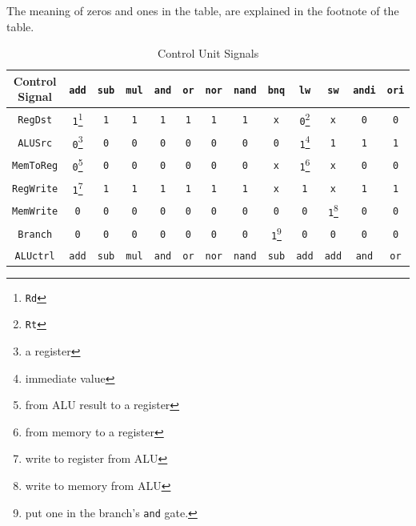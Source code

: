 \documentclass[12pt, dvipsnames, svgnames, x11names, oneside]{book}
\begin{document}
The meaning of zeros and ones in the table, are explained in the footnote of the table.

\begin{table}
\caption{Control Unit Signals}
\begin{center}
\begin{tabular}{|c|c|c|c|c|c|c|c|c|c|c|c|c|}
\hline
Control Signal &
\texttt{add} &
\texttt{sub} &
\texttt{mul} &
\texttt{and} &
\texttt{or} &
\texttt{nor} &
\texttt{nand} &
\texttt{bnq} &
\texttt{lw} &
\texttt{sw} &
\texttt{andi} &
\texttt{ori} \\
\hline
\hline
\texttt{RegDst} & 
\texttt{1}\footnote{\texttt{Rd}} &
\texttt{1} &
\texttt{1} &
\texttt{1} &
\texttt{1} &
\texttt{1} &
\texttt{1} &
\texttt{x} &
\texttt{0}\footnote{\texttt{Rt}} &
\texttt{x} &
\texttt{0} &
\texttt{0} \\
\hline
\texttt{ALUSrc} &
\texttt{0}\footnote{a register} &
\texttt{0} &
\texttt{0} &
\texttt{0} &
\texttt{0} &
\texttt{0} &
\texttt{0} &
\texttt{0} &
\texttt{1}\footnote{immediate value} &
\texttt{1} &
\texttt{1} &
\texttt{1} \\ 
\hline
\texttt{MemToReg} &
\texttt{0}\footnote{from ALU result to a register} &
\texttt{0} &
\texttt{0} &
\texttt{0} &
\texttt{0} &
\texttt{0} &
\texttt{0} &
\texttt{x} &
\texttt{1}\footnote{from memory to a register} &
\texttt{x} &
\texttt{0} &
\texttt{0} \\ 
\hline
\texttt{RegWrite} &
\texttt{1}\footnote{write to register from ALU} &
\texttt{1} &
\texttt{1} &
\texttt{1} &
\texttt{1} &
\texttt{1} &
\texttt{1} &
\texttt{x} &
\texttt{1} &
\texttt{x} &
\texttt{1} &
\texttt{1} \\ 
\hline
\texttt{MemWrite} &
\texttt{0} &
\texttt{0} &
\texttt{0} &
\texttt{0} &
\texttt{0} &
\texttt{0} &
\texttt{0} &
\texttt{0} &
\texttt{0} &
\texttt{1}\footnote{write to memory from ALU} &
\texttt{0} &
\texttt{0} \\ 
\hline
\texttt{Branch} &
\texttt{0} &
\texttt{0} &
\texttt{0} &
\texttt{0} &
\texttt{0} &
\texttt{0} &
\texttt{0} &
\texttt{1}\footnote{put one in the branch's \texttt{and} gate.} &
\texttt{0} &
\texttt{0} &
\texttt{0} &
\texttt{0} \\ 
\hline
\texttt{ALUctrl} &
\texttt{add} &
\texttt{sub} &
\texttt{mul} &
\texttt{and} &
\texttt{or} &
\texttt{nor} &
\texttt{nand} &
\texttt{sub} &
\texttt{add} &
\texttt{add} &
\texttt{and} &
\texttt{or} \\ 
\hline
\end{tabular}
\end{center}
\end{table}\label{sec:table:cu}
\end{document}
